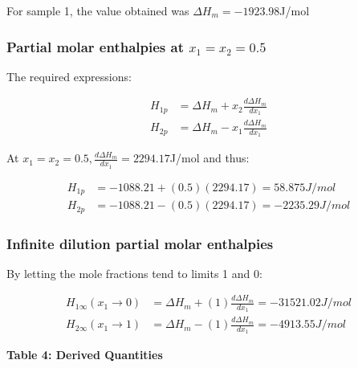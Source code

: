 \documentclass[11pt]{article}
\begin{document}
For sample 1, the value obtained was \(\Delta H_m=-1923.98\)J/mol

\hypertarget{partial-molar-enthalpies-at-x_1x_20.5}{%
  \subsubsection{\texorpdfstring{Partial molar enthalpies at
      \(x_1=x_2=0.5\)}{Partial molar enthalpies at x\_1=x\_2=0.5}}\label{partial-molar-enthalpies-at-x_1x_20.5}}

The required expressions:

\begin{equation}
  \begin{split}
    H_{1p}&=\Delta H_m+x_2\frac{d\Delta H_m}{dx_1}\\
    H_{2p}&=\Delta H_m-x_1\frac{d\Delta H_m}{dx_1}
  \end{split}
\end{equation}

At \(x_1=x_2=0.5, \frac{d\Delta H_m}{dx_1}=2294.17\)J/mol and thus:

\begin{equation}
  \begin{split}
    H_{1p}&=-1088.21+(0.5)(2294.17)=58.875J/mol\\
    H_{2p}&=-1088.21-(0.5)(2294.17)=-2235.29J/mol
  \end{split}
\end{equation}

\hypertarget{infinite-dilution-partial-molar-enthalpies}{%
  \subsubsection{Infinite dilution partial molar
    enthalpies}\label{infinite-dilution-partial-molar-enthalpies}}

By letting the mole fractions tend to limits 1 and 0:

\begin{equation}
  \begin{split}
    H_{1\infty}(x_1\to0)&=\Delta H_m+(1)\frac{d\Delta H_m}{dx_1}=-31521.02J/mol\\
    H_{2\infty}(x_1\to1)&=\Delta H_m-(1)\frac{d\Delta H_m}{dx_1}=-4913.55J/mol
  \end{split}
\end{equation}

\textbf{Table 4: Derived Quantities}

\begin{center}
\end{center}
\end{document}
